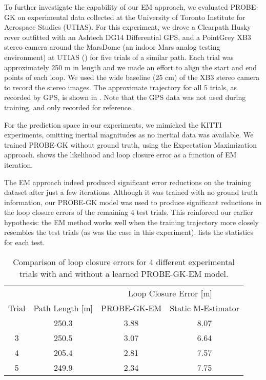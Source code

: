 To further investigate the capability of our EM approach, we evaluated PROBE-GK on experimental data collected at the University of Toronto Institute for Aerospace Studies (UTIAS). For this experiment, we drove a Clearpath Husky rover outfitted with an Ashtech DG14 Differential GPS, and a PointGrey XB3 stereo camera around the MarsDome (an indoor Mars analog testing environment) at UTIAS () for five trials of a similar path.  Each trial was approximately 250 m in length and we made an effort to align the start and end points of each loop. We used the wide baseline (25 cm) of the XB3 stereo camera to record the stereo images. The approximate trajectory for all 5 trials, as recorded by GPS, is shown in .  Note that the GPS data was not used during training, and only recorded for reference.

For the prediction space in our experiments, we mimicked the KITTI experiments, omitting inertial magnitudes as no inertial data was available. We trained PROBE-GK without ground truth, using the Expectation Maximization approach.  shows the likelihood and loop closure error as a function of EM iteration. 

The EM approach indeed produced significant error reductions on the training dataset after just a few iterations.  Although  it was trained with no ground truth information, our PROBE-GK model was used to produce significant reductions in the loop closure errors of the remaining 4 test trials. This reinforced our earlier hypothesis: the EM method works well when the training trajectory more closely resembles the test trials (as was the case in this experiment).  lists the statistics for each test. 


\begin{table}
\centering
\caption{Comparison of loop closure errors for 4 different experimental trials
  with and without a learned PROBE-GK-EM model.}
\begin{tabular}{ c  c  c  c }
     & & \multicolumn{2}{c}{Loop Closure Error [m]}  \\ \cline{3-4} \T
    Trial & Path Length [m] & PROBE-GK-EM & Static M-Estimator \\    
      \hline \T	
  2 & 250.3 & 3.88 & 8.07 \\
  3 & 250.5 & 3.07 & 6.64 \\
  4 & 205.4 & 2.81 & 7.57 \\
  5 & 249.9 & 2.34 & 7.75 \\ \hline
\end{tabular}
\label{table:probe-gk_loop_closure_errors}
\end{table}

